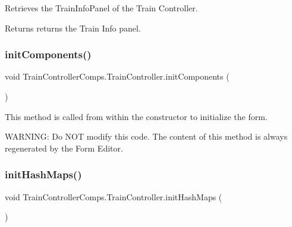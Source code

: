 Retrieves the Train\+Info\+Panel of the Train Controller. 

\begin{DoxyReturn}{Returns}
returns the Train Info panel. 
\end{DoxyReturn}
\mbox{\label{classTrainControllerComps_1_1TrainController_a32ab56235b79bdc3abeacc716c582a7e}} 
\subsubsection{\texorpdfstring{init\+Components()}{initComponents()}}
{\footnotesize\ttfamily void Train\+Controller\+Comps.\+Train\+Controller.\+init\+Components (\begin{DoxyParamCaption}{ }\end{DoxyParamCaption})\hspace{0.3cm}{\ttfamily [private]}}



This method is called from within the constructor to initialize the form. 

W\+A\+R\+N\+I\+NG\+: Do N\+OT modify this code. The content of this method is always regenerated by the Form Editor. \mbox{\label{classTrainControllerComps_1_1TrainController_ab44cad6ee65d5a8536ae1df5a34cd58a}} 
\subsubsection{\texorpdfstring{init\+Hash\+Maps()}{initHashMaps()}}
{\footnotesize\ttfamily void Train\+Controller\+Comps.\+Train\+Controller.\+init\+Hash\+Maps (\begin{DoxyParamCaption}{ }\end{DoxyParamCaption})\hspace{0.3cm}{\ttfamily [private]}}



